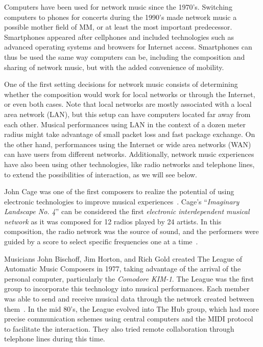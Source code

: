 Computers have been used for network music since the 1970's.
Switching computers to phones for concerts during the 1990's made network music a possible mother field of MM, or at least the most important predecessor.
Smartphones appeared after cellphones and included technologies such as advanced operating systems and browsers for Internet access.
Smartphones can thus be used the same way computers can be, including the composition and sharing of network music, but with the added convenience of mobility.

One of the first setting decisions for network music consists of determining whether the composition would work for local networks or through the Internet, or even both cases.
Note that local networks are mostly associated with a local area network (LAN), but this setup can have computers located far away from each other.
Musical performances using LAN in the context of a dozen meter radius might take advantage of small packet loss and fast package exchange.
On the other hand, performances using the Internet or wide area networks (WAN) can have users from different networks.
Additionally, network music experiences have also been using other technologies, like radio networks and telephone lines, to extend the possibilities of interaction, as we will see below.

John Cage was one of the first composers to realize the potential of using electronic technologies to improve musical experiences~\citep[p.~16-17]{Weinberg2003}.
Cage's ``\textit{Imaginary Landscape No. 4}'' can be considered the first \textit{electronic interdependent musical network} as it was composed for 12 radios played by 24 artists.
In this composition, the radio network was the source of sound, and the performers were guided by a score to select specific frequencies one at a time~\citep[p.~24-25]{Weinberg2003}. 

Musicians John Bischoff, Jim Horton, and Rich Gold created The League of Automatic Music Composers in 1977, taking advantage of the arrival of the personal computer, particularly the \textit{Comodore KIM-1}.
The League was the first group to incorporate this technology into musical performances.
Each member was able to send and receive musical data through the network created between them~\citep[p.~29]{Weinberg2003}.
In the mid 80's, the League evolved into The Hub group, which had more precise communication schemes using central computers and the MIDI protocol to facilitate the interaction.
They also tried remote collaboration through telephone lines during this time.

